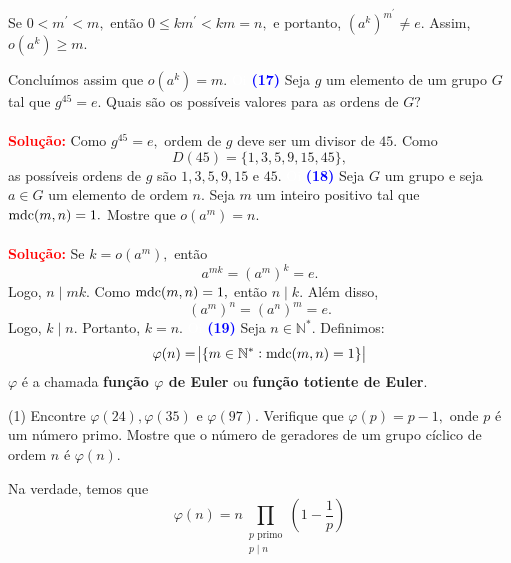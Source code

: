 \documentclass[12pt, a4paper]{article}
\newcommand{\mdc}{{\rm mdc}}
\newcommand{\negrito}[1]{\mbox{\boldmath{$#1$}}}
\begin{document}
Se $0 < m^{\prime} < m,$ então $0 \le km^{\prime} < km = n,$ e portanto, $(a^k)^{m^{\prime}} \neq e.$ Assim, $o(a^k) \ge m.$ 

Concluímos assim que $o(a^k) = m.$
\textcolor{white}{Oi}\newline\newline
\textcolor{blue}{\bf(17)}\label{ex3}  Seja $g$ um elemento de um grupo $G$ tal que $g^{45} = e.$ Quais são os possíveis valores para as ordens de $G?$\\ \\ 
\textbf{\textcolor{red}{Solução:}} Como $g^{45} = e,$ ordem de $g$ deve ser um divisor de $45.$ Como 
\[D(45) = \{1,3,5,9,15,45 \},\]
as possíveis ordens de $g$ são $1,3,5,9,15$ e $45.$
\textcolor{white}{Oi}\newline\newline
\textcolor{blue}{\bf(18)}\label{25} Seja $G$ um grupo e seja $a \in G$  um elemento de ordem $n$. Seja  $m$ um inteiro positivo tal que $\mdc(m,n) = 1.$ Mostre que $o(a^m) = n.$ %
\\ \\ 
\textbf{\textcolor{red}{Solução:}} Se $k = o(a^m),$ então
\[
a^{mk} = (a^m)^k = e.
\]
Logo, $n \mid mk.$ Como $\mdc(m,n) = 1,$ então $n \mid k.$ Além disso,
\[
(a^m)^n = (a^n)^m = e.
\]
Logo, $k \mid n.$ Portanto, $k=n.$
\textcolor{white}{Oi}\newline\newline
\textcolor{blue}{\bf(19)}\label{26} Seja $n \in \mathbb{N}^{*}.$ Definimos:
\[
\varphi(n) = \abs{\{ m \in \mathbb{N}^{*} : \mdc(m,n) = 1 \}}
\]
$\varphi$ é a chamada \textbf{função $\varphi$ de Euler} ou \textbf{função totiente de Euler}.
\begin{tasks}[counter-format={(tsk[a])},label-width=3.6ex, label-format = {\bfseries}, column-sep = {0pt}](1)
\task[\textcolor{Floresta}{$\negrito{(a)} $}] Encontre $\varphi(24),\varphi(35)$ e $\varphi(97).$
\task[\textcolor{Floresta}{$\negrito{(b)} $}] Verifique que $\varphi(p) = p-1,$ onde $p$ é um número primo.
\task[\textcolor{Floresta}{$\negrito{(c)} $}]  Mostre que o número de geradores de um grupo cíclico de ordem $n$ é $\varphi(n).$
\end{tasks}
Na verdade, temos que 
\[
\varphi(n) = n \prod\limits_{\substack{p \mbox{ primo} \\ p \mid n }} \left(1 - \frac{1}{p} \right) 
\]
\end{document}
